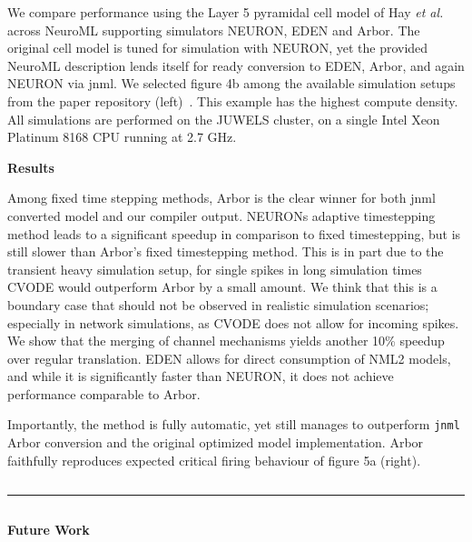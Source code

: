 \documentclass{beamer}
\begin{document}
\begin{frame}[t, fragile]
\begin{columns}
\begin{column}{0.73\textwidth}
\begin{columns}[t]
\begin{column}[t]{0.53\textwidth}
          We compare performance using the Layer 5 pyramidal cell model of Hay
          \emph{et al.} across NeuroML supporting simulators NEURON, EDEN and Arbor.
          The original cell model is tuned for simulation with NEURON, yet the
          provided NeuroML description lends itself for ready conversion to EDEN,
          Arbor, and again NEURON via jnml. We selected figure 4b among the
          available simulation setups from the paper repository (left)~\cite{HayNML}. This
          example has the highest compute density. All simulations are
          performed on the JUWELS cluster, on a single Intel Xeon Platinum 8168 CPU
          running at 2.7 GHz.

          \textbf{Results}

          Among fixed time stepping methods, Arbor is the clear winner for both jnml
          converted model and our \nmlcc compiler output. NEURONs adaptive
          timestepping method leads to a significant speedup in comparison to fixed
          timestepping, but is still slower than Arbor's fixed timestepping method.
          This is in part due to the transient heavy simulation setup, for single
          spikes in long simulation times CVODE would outperform Arbor by a small
          amount. We think that this is a boundary case that should not be observed
          in realistic simulation scenarios; especially in network simulations, as
          CVODE does not allow for incoming spikes. We show that the merging of
          channel mechanisms yields another 10\% speedup over regular translation.
          EDEN allows for direct consumption of NML2 models, and while it is
          significantly faster than NEURON, it does not achieve performance
          comparable to Arbor.

          Importantly, the \nmlcc method is fully automatic, yet still manages to
          outperform \texttt{jnml} Arbor conversion and the original optimized model
          implementation. Arbor \nmlcc faithfully reproduces expected critical firing
          behaviour of figure 5a (right).
        \end{column}
      \end{columns}
      \vspace*{1ex}
      \textcolor{arbred}{\rule{\textwidth}{0.59ex}}
      \vspace*{-1ex}
      \begin{columns}[t]
        \begin{column}[t]{0.49\textwidth}
          \textbf{Future Work}


\end{column}
\end{columns}
\end{column}
\end{columns}
\end{frame}
\end{document}
